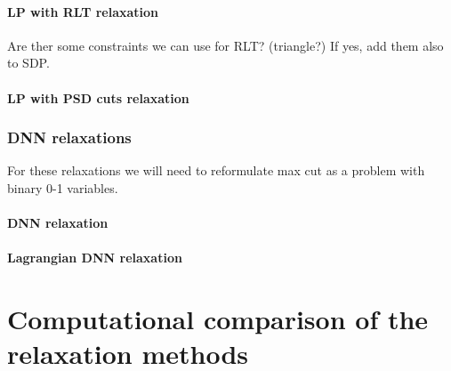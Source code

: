 \documentclass[12pt]{book}
\theoremstyle{definition}
\begin{document}
\subsubsection{LP with RLT relaxation} 
Are ther some constraints we can use for RLT? (triangle?)
If yes, add them also to SDP.

\subsubsection{LP with PSD cuts relaxation}






\subsection{DNN relaxations}
For these relaxations we will need to reformulate max cut as a problem with binary 0-1 variables.


\subsubsection{DNN relaxation}

\subsubsection{Lagrangian DNN relaxation}














%
%
%
%





\chapter{Computational comparison of the relaxation methods}
\end{document}
